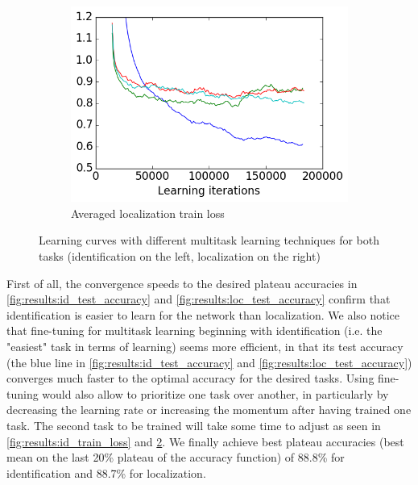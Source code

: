 \begin{figure}[htb]
\begin{subfigure}[t]{0.45\textwidth}
    \includegraphics[scale=0.45]{images-architecture-compare/loc_train_loss}
    \caption{Averaged localization train loss}
    \label{fig:results:loc_train_loss}
\end{subfigure}
\caption{Learning curves with different multitask learning techniques for both tasks (identification on the left, localization on the right)}
\end{figure}

First of all, the convergence speeds to the desired plateau accuracies in \ref{fig:results:id_test_accuracy} and \ref{fig:results:loc_test_accuracy} confirm that identification is easier to learn for the network than localization.
We also notice that fine-tuning for multitask learning beginning with identification (i.e. the "easiest" task in terms of learning) seems more efficient, in that its test accuracy (the blue line in \ref{fig:results:id_test_accuracy} and \ref{fig:results:loc_test_accuracy}) converges much faster to the optimal accuracy for the desired tasks. Using fine-tuning would also allow to prioritize one task over another, in particularly by decreasing the learning rate or increasing the momentum after having trained one task. The second task to be trained will take some time to adjust as seen in \ref{fig:results:id_train_loss} and \ref{fig:results:loc_train_loss}. We finally achieve best plateau accuracies (best mean on the last 20\% plateau of the accuracy function) of 88.8\% for identification and 88.7\% for localization.

